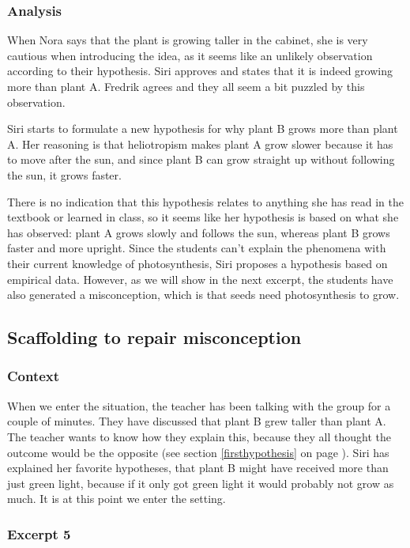 \subsubsection*{Analysis}
When Nora says that the plant is growing taller in the cabinet, she is very cautious when introducing the idea, as it seems like an unlikely observation according to their hypothesis. Siri approves and states that it is indeed growing more than plant A. Fredrik agrees and they all seem a bit puzzled by this observation.

Siri starts to formulate a new hypothesis for why plant B grows more than plant A. Her reasoning is that heliotropism makes plant A grow slower because it has to move after the sun, and since plant B can grow straight up without following the sun, it grows faster. 

There is no indication that this hypothesis relates to anything she has read in the textbook or learned in class, so it seems like her hypothesis is based on what she has observed: plant A grows slowly and follows the sun, whereas plant B grows faster and more upright. Since the students can't explain the phenomena with their current knowledge of photosynthesis, Siri proposes a hypothesis based on empirical data. However, as we will show in the next excerpt, the students have also generated a misconception, which is that seeds need photosynthesis to grow.


\subsection{Scaffolding to repair misconception}

\subsubsection*{Context}
When we enter the situation, the teacher has been talking with the group for a couple of minutes. They have discussed that plant B grew taller than plant A. The teacher wants to know how they explain this, because they all thought the outcome would be the opposite (see section \ref{firsthypothesis} on page \pageref{firsthypothesis}). Siri has explained her favorite hypotheses, that plant B might have received more than just green light, because if it only got green light it would probably not grow as much.  It is at this point we enter the setting.
 
\subsubsection*{Excerpt 5}\label{ex:excerpt5}

